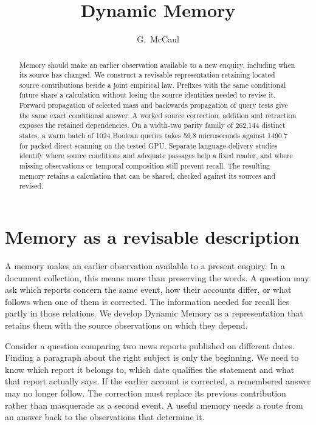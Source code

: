 \documentclass[reprint,aps,prx,superscriptaddress,nofootinbib,longbibliography]{revtex4-2}
\begin{document}
\raggedbottom
\title{Dynamic Memory}
\author{G.\ McCaul}
\begin{abstract}
Memory should make an earlier observation available to a new enquiry, including when its source has changed.
We construct a revisable representation retaining located source contributions beside a joint empirical law.
Prefixes with the same conditional future share a calculation without losing the source identities needed to revise it.
Forward propagation of selected mass and backwards propagation of query tests give the same exact conditional answer.
A worked source correction, addition and retraction exposes the retained dependencies.
On a width-two parity family of 262,144 distinct states, a warm batch of 1024 Boolean queries takes 59.8 microseconds against 1490.7 for packed direct scanning on the tested GPU.
Separate language-delivery studies identify where source conditions and adequate passages help a fixed reader, and where missing observations or temporal composition still prevent recall.
The resulting memory retains a calculation that can be shared, checked against its sources and revised.
\end{abstract}
\maketitle

\section{Memory as a revisable description}
\label{sec:intro}
A memory makes an earlier observation available to a present enquiry.
In a document collection, this means more than preserving the words.
A question may ask which reports concern the same event, how their accounts differ, or what follows when one of them is corrected.
The information needed for recall lies partly in those relations.
We develop Dynamic Memory as a representation that retains them with the source observations on which they depend.

Consider a question comparing two news reports published on different dates.
Finding a paragraph about the right subject is only the beginning.
We need to know which report it belongs to, which date qualifies the statement and what that report actually says.
If the earlier account is corrected, a remembered answer may no longer follow.
The correction must replace its previous contribution rather than masquerade as a second event.
A useful memory needs a route from an answer back to the observations that determine it.
\end{document}
